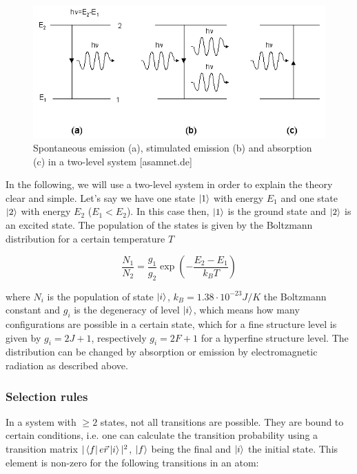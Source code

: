 \begin{figure}[H]
\centering \includegraphics[width = \textwidth]{BilderTheo/absorptionemission.png}
\caption{Spontaneous emission (a), stimulated emission (b) and absorption (c) in a two-level system [asamnet.de]}
\end{figure}

In the following, we will use a two-level system in order to explain the theory clear and simple. Let's say we have one state $\ket{1}$ with energy $E_1$ and one state $\ket{2}$ with energy $E_2$ ($E_1 < E_2$). In this case then, $\ket{1}$ is the ground state and $\ket{2}$ is an excited state. The population of the states is given by the Boltzmann distribution for a certain temperature $T$

$$\frac{N_1}{N_2} = \frac{g_1}{g_2}\exp\left(-\frac{E_2-E_1}{k_BT} \right)$$

where $N_i$ is the population of state $\ket{i}$, $k_B = 1.38\cdot10^{-23} J/K$ the Boltzmann constant and $g_i$ is the degeneracy of level $\ket{i}$, which means how many configurations are possible in a certain state, which for a fine structure level is given by $g_i = 2J +1$, respectively $g_i = 2F+1$ for a hyperfine structure level. The distribution can be changed by absorption or emission by electromagnetic radiation as described above. 

\subsubsection{Selection rules}
\label{sec:selection}

In a system with $\geq 2$ states, not all transitions are possible. They are bound to certain conditions, i.e. one can calculate the transition probability using a transition matrix $|\bra{f}e\vec r\ket{i}|^2$, $\ket{f}$ being the final and $\ket{i}$ the initial state. This element is non-zero for the following transitions in an atom:

